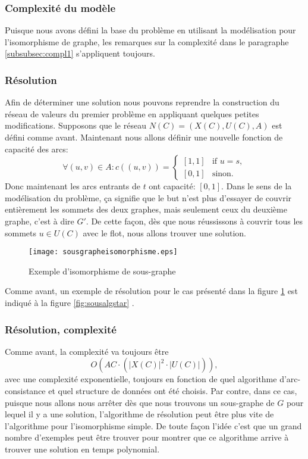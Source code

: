 \documentclass[french]{article}
\theoremstyle{definition}
\theoremstyle{remark}
\begin{document}
\subsubsection{Complexité du modèle}
Puisque nous avons défini la base du problème en utilisant la modélisation pour l'isomorphisme de graphe, les remarques sur la complexité dans le paragraphe \ref{subsubsec:compl1} s'appliquent toujours.

\subsubsection{Résolution}
\label{sssec:res}
Afin de déterminer une solution nous pouvons reprendre la construction du réseau de valeurs du premier problème en appliquant quelques petites modifications. Supposons que le réseau $N(C)=(X(C), U(C), A)$ est défini comme avant. Maintenant nous allons définir une nouvelle fonction de capacité des arcs:
\[  \forall (u,v) \in A:
c((u,v))= 
\begin{cases}
[1,1]& \text{if } u=s,\\
[0,1]              & \text{sinon}.
\end{cases}
\]
Donc maintenant les arcs entrants de $t$ ont capacité: $[0,1]$. Dans le sens de la modélisation du problème, ça signifie que le but n'est plus d'essayer de couvrir entièrement les sommets des deux graphes, mais seulement ceux du deuxième graphe, c'est à dire $G'$. De cette façon, dès que nous réussissons à couvrir tous les sommets $u \in U(C)$ avec le flot, nous allons trouver une solution. 
\begin{figure}[t]
	\centering
	\texttt{[image: sousgrapheisomorphisme.eps]}
	\caption{\label{fig:isosubgraph}Exemple d'isomorphisme de sous-graphe}
\end{figure}
Comme avant, un exemple de résolution pour le cas présenté dans la figure \ref{fig:isosubgraph} est indiqué à la figure \ref{fig:sousalgstar} .

\subsubsection{Résolution, complexité}
Comme avant, la complexité va toujours être 
 $$O(AC \cdot (|X(C)|^2 \cdot |U(C)|)),$$
avec une complexité exponentielle, toujours en fonction de quel algorithme d'arc-consistance et quel structure de données ont été choisis. Par contre, dans ce cas, puisque nous allons nous arrêter dès que nous trouvons un sous-graphe de $G$ pour lequel il y a une solution, l'algorithme de résolution peut être plus vite de l'algorithme pour l'isomorphisme simple. De toute façon l'idée c'est que un grand nombre d'exemples peut être trouver pour montrer que ce algorithme arrive à trouver une solution en temps polynomial.
\end{document}
